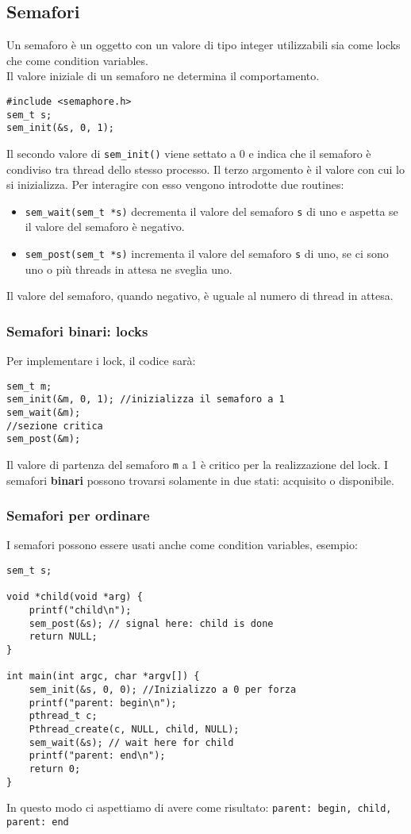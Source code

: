 \documentclass[12pt, letterpaper]{article}
\begin{document}
		\subsection{Semafori}
			Un semaforo è un oggetto con un valore di tipo integer utilizzabili sia come locks che come condition variables.
			\\Il valore iniziale di un semaforo ne determina il comportamento.
			\begin{lstlisting}[style=CStyle]
#include <semaphore.h>
sem_t s;
sem_init(&s, 0, 1);			\end{lstlisting}
			Il secondo valore di \texttt{sem\_init()} viene settato a 0 e indica che il semaforo è condiviso tra thread dello stesso processo. Il terzo argomento è il valore con cui lo si inizializza. Per interagire con esso vengono introdotte due routines: 
			\begin{itemize}
				\item \texttt{sem\_wait(sem\_t *s)} decrementa il valore del semaforo \texttt{s} di uno e aspetta se il valore del semaforo è negativo.
				\item \texttt{sem\_post(sem\_t *s)} incrementa il valore del semaforo \texttt{s} di uno, se ci sono uno o più threads in attesa ne sveglia uno.
			\end{itemize}
			
			Il valore del semaforo, quando negativo, è uguale al numero di thread in attesa.
			\subsubsection{Semafori binari: locks}
				Per implementare i lock, il codice sarà: 
				\begin{lstlisting}[style=CStyle]
sem_t m;
sem_init(&m, 0, 1); //inizializza il semaforo a 1
sem_wait(&m);
//sezione critica
sem_post(&m); 	\end{lstlisting}
				Il valore di partenza del semaforo \texttt{m} a 1  è critico per la realizzazione del lock. I semafori \textbf{binari} possono trovarsi solamente in due  stati: acquisito o disponibile. 
			
			\subsubsection{Semafori per ordinare}
				I semafori possono essere usati anche come condition variables, esempio: 
				\begin{lstlisting}[style=CStyle]
sem_t s;

void *child(void *arg) {
	printf("child\n");
	sem_post(&s); // signal here: child is done
	return NULL;
}

int main(int argc, char *argv[]) {
	sem_init(&s, 0, 0); //Inizializzo a 0 per forza
	printf("parent: begin\n");
	pthread_t c;
	Pthread_create(c, NULL, child, NULL);
	sem_wait(&s); // wait here for child
	printf("parent: end\n");
	return 0;
}				\end{lstlisting}
				In questo modo ci aspettiamo di avere come risultato: \texttt{parent: begin, child, parent: end}
			
\end{document}

